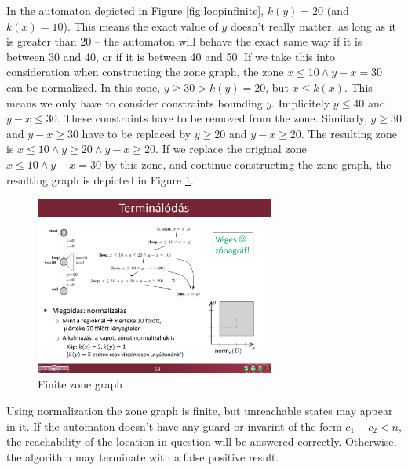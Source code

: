 \begin{example}
In the automaton depicted in Figure \ref{fig:loopinfinite}, $k(y)=20$ (and $k(x)=10$). This means the exact value of $y$ doesn't really matter, as long as it is greater than 20 -- the automaton will behave the exact same way if it is between 30 and 40, or if it is between 40 and 50. %
If we take this into consideration when constructing the zone graph, the zone  $x \leq 10 \wedge y-x=30$ can be normalized. In this zone, $y \geq 30 > k(y)=20$, but $x \leq k(x)$. This means we only have to consider constraints bounding $y$.
Implicitely $y \leq 40$ and $y-x \leq 30$. These constraints have to be removed from the zone. Similarly, $y \geq 30$ and $y-x \geq 30$ have to be replaced by $y \geq 20$ and $y-x \geq 20$. The resulting zone is $x \leq 10 \wedge y \geq 20 \wedge y-x \geq 20$. If we replace the original zone  $x \leq 10 \wedge y-x=30$ by this zone, and continue constructing the zone graph, the resulting graph is depicted in Figure \ref{fig:looprealgraph}.

\end{example}

\begin{figure}
	\centering
	\includegraphics [width=0.7\textwidth] {include/figures/loop_real_zonegraph}%
	\caption{Finite zone graph}
	\label{fig:looprealgraph}
\end{figure}

Using normalization the zone graph is finite, but unreachable states may appear in it. If the automaton doesn't have any guard or invarint of the form $c_1 - c_2 < n$, the reachability of the location in question will be answered correctly. Otherwise, the algorithm may terminate with a false positive result.


